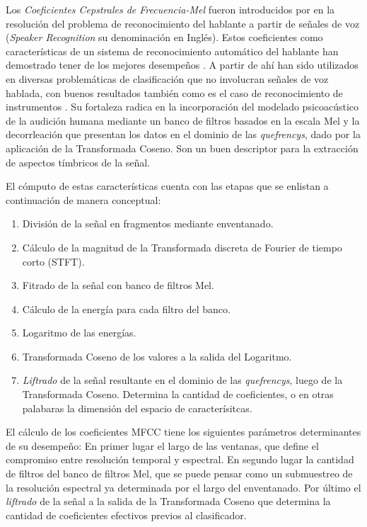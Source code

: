 \documentclass{article}
\begin{document}
Los \textit{Coeficientes Cepstrales de Frecuencia-Mel} fueron introducidos por \cite{davis1980comparison} en la resolución del problema de reconocimiento del hablante a partir de señales de voz (\textit{Speaker Recognition} su denominación en Inglés). Estos coeficientes como características de un sistema de reconocimiento automático del hablante han demostrado tener de los mejores desempeños \citep[Capítulo~14]{quatieri2002discrete}. A partir de ahí han sido utilizados en diversas problemáticas de clasificación que no involucran señales de voz hablada, con buenos resultados también como es el caso de reconocimiento de instrumentos \citep[Capítulo~6]{klapuri2007signal}. Su fortaleza radica en la incorporación del modelado psicoacústico de la audición humana mediante un banco de filtros basados en la escala Mel \citep{stevens1937scale} y la decorrleación que presentan los datos en el dominio de las \textit{quefrencys}, dado por la aplicación de la Transformada Coseno. Son un buen descriptor para la extracción de aspectos tímbricos de la señal.
\medskip

El cómputo de estas características cuenta con las etapas que se enlistan a continuación de manera conceptual: 

\begin{enumerate}
	\item División de la señal en fragmentos mediante enventanado.
	\item Cálculo de la magnitud de la Transformada discreta de Fourier de tiempo corto (STFT).
	\item Fitrado de la señal con banco de filtros Mel.
	\item Cálculo de la energía para cada filtro del banco.
	\item Logaritmo de las energías.
	\item Transformada Coseno de los valores a la salida del Logaritmo.
	\item \textit{Liftrado} de la señal resultante en el dominio de las \textit{quefrencys}, luego de la Transformada Coseno. Determina la cantidad de coeficientes, o en otras palabaras la dimensión del espacio de caracterísitcas.
\end{enumerate}

El cálculo de los coeficientes MFCC tiene los siguientes parámetros determinantes de su desempeño: En primer lugar el largo de las ventanas, que define el compromiso entre resolución temporal y espectral. En segundo lugar la cantidad de filtros del banco de filtros Mel, que se puede pensar como un submuestreo de la resolución espectral ya determinada por el largo del enventanado. Por último el \textit{liftrado} de la señal a la salida de la Transformada Coseno que determina la cantidad de coeficientes efectivos previos al clasificador.
\medskip
\end{document}

